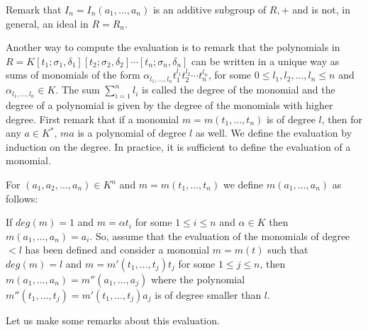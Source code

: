 \documentclass{amsproc}
\newcommand{\de}{\delta}
\newcommand{\si}{\sigma}
\numberwithin{equation}{section}
\newcommand{\mulo}{K[t_1;\si_1,\de_1][t_2;\si_2,\de_2]\cdots[t_n;\si_n,\de_n]}
\begin{document}
Remark that $I_n=I_n(a_1,\dots,a_n)$ is an additive subgroup of $R,+$ and is not, in general, an ideal in $R=R_n$.  

Another way to compute the evaluation is to remark that the polynomials in $R=\mulo$ can be written in a unique way as sums of monomials of the form $\alpha_{l_1,\dots ,l_n}t_1^{l_1}t_2^{l_2}\cdots t_n^{l_n}$, for some $0\le l_1,l_2,\dots,l_n\le n$ and $\alpha_{l_1,\dots ,l_n}\in K$. The sum $\sum_{i=1}^nl_i$ is called the degree of the monomial and the degree of a polynomial is given by the degree of the monomials with higher degree.  
First remark that if a monomial $m=m(t_1,\dots , t_n)$ is of degree $l$, then for any $a\in K^{*}$, $ma$ is a polynomial of degree $l$ as well.  We define the evaluation by induction on the degree.
In practice, it is sufficient to define the evaluation of a monomial.

For $(a_1,a_2,\dots,a_n)\in K^n$ and $m=m(t_1,\dots , t_n)$ we define $m(a_1,\dots , a_n)$ as follows:

If $deg(m)=1$ and $m=\alpha t_i$ for some $1\le i \le n$ and $\alpha \in K$ then  $m(a_1,\dots , a_n)=a_i$.   
So, assume that the evaluation of the monomials of degree $<l$ has been defined and consider a monomial $m=m(t)$ such that
$deg(m)=l$ and $m=m'(t_1,\dots,t_j)t_j$ for some $1\le j \le n$,
then $m(a_1,\dots,a_n)=m''(a_1,\dots,a_j)$ where the polynomial 
$m''(t_1,\dots,t_j)=m'(t_1,\dots,t_j)a_j$ is of degree smaller than $l$.


Let us make some remarks about this evaluation.
\end{document}
